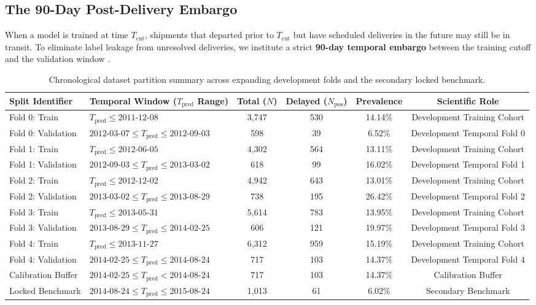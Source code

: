 \documentclass[11pt,a4paper]{article}
\begin{document}
\subsection{The 90-Day Post-Delivery Embargo}
When a model is trained at time $T_{\text{cut}}$, shipments that departed prior to $T_{\text{cut}}$ but have scheduled deliveries in the future may still be in transit. To eliminate label leakage from unresolved deliveries, we institute a strict \textbf{90-day temporal embargo} between the training cutoff and the validation window \cite{deprado2018advances}.

\begin{table}[htbp]
\centering
\caption{Chronological dataset partition summary across expanding development folds and the secondary locked benchmark.}
\label{tab:dataset_protocol}
\small
\begin{tabular}{llcccc}
\toprule
\textbf{Split Identifier} & \textbf{Temporal Window ($T_{\text{pred}}$ Range)} & \textbf{Total ($N$)} & \textbf{Delayed ($N_{\text{pos}}$)} & \textbf{Prevalence} & \textbf{Scientific Role} \\
\midrule
Fold 0: Train & $T_{\text{pred}} \le \text{2011-12-08}$ & 3,747 & 530 & 14.14\% & Development Training Cohort \\
Fold 0: Validation & $\text{2012-03-07} \le T_{\text{pred}} \le \text{2012-09-03}$ & 598 & 39 & 6.52\% & Development Temporal Fold 0 \\
Fold 1: Train & $T_{\text{pred}} \le \text{2012-06-05}$ & 4,302 & 564 & 13.11\% & Development Training Cohort \\
Fold 1: Validation & $\text{2012-09-03} \le T_{\text{pred}} \le \text{2013-03-02}$ & 618 & 99 & 16.02\% & Development Temporal Fold 1 \\
Fold 2: Train & $T_{\text{pred}} \le \text{2012-12-02}$ & 4,942 & 643 & 13.01\% & Development Training Cohort \\
Fold 2: Validation & $\text{2013-03-02} \le T_{\text{pred}} \le \text{2013-08-29}$ & 738 & 195 & 26.42\% & Development Temporal Fold 2 \\
Fold 3: Train & $T_{\text{pred}} \le \text{2013-05-31}$ & 5,614 & 783 & 13.95\% & Development Training Cohort \\
Fold 3: Validation & $\text{2013-08-29} \le T_{\text{pred}} \le \text{2014-02-25}$ & 606 & 121 & 19.97\% & Development Temporal Fold 3 \\
Fold 4: Train & $T_{\text{pred}} \le \text{2013-11-27}$ & 6,312 & 959 & 15.19\% & Development Training Cohort \\
Fold 4: Validation & $\text{2014-02-25} \le T_{\text{pred}} \le \text{2014-08-24}$ & 717 & 103 & 14.37\% & Development Temporal Fold 4 \\
Calibration Buffer & $\text{2014-02-25} \le T_{\text{pred}} < \text{2014-08-24}$ & 717 & 103 & 14.37\% & Calibration Buffer \\
Locked Benchmark & $\text{2014-08-24} \le T_{\text{pred}} \le \text{2015-08-24}$ & 1,013 & 61 & 6.02\% & Secondary Benchmark \\
\bottomrule
\end{tabular}
\end{table}
\end{document}
